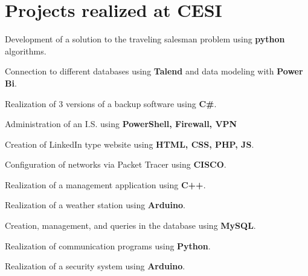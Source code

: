 \documentclass[a4paper,table]{twentysecondcv}
\begin{document}
\vspace{-0.4cm}

\section{Projects realized at CESI}

\vspace{-0.2cm}
\begin{twenty}

{}
{Development of a solution to the traveling salesman problem using \textbf{python} algorithms.}

{}
{Connection to different databases using \textbf{Talend} and data modeling with \textbf{Power Bi}.}

{}
{Realization of 3 versions of a backup software using \textbf{C\#}.}

{}
{Administration of an I.S. using \textbf{PowerShell, Firewall, VPN}}

{}
{Creation of LinkedIn type website using \textbf{HTML, CSS, PHP, JS}.}

{}
{Configuration of networks via Packet Tracer using \textbf{CISCO}.}

{}
{Realization of a management application using \textbf{C++}.}

{}
{Realization of a weather station using \textbf{Arduino}.}

{}
{Creation, management, and queries in the database using \textbf{MySQL}.}

{}
{Realization of communication programs using \textbf{Python}.}

{}
{Realization of a security system using \textbf{Arduino}.}

\end{twenty}
\end{document}
